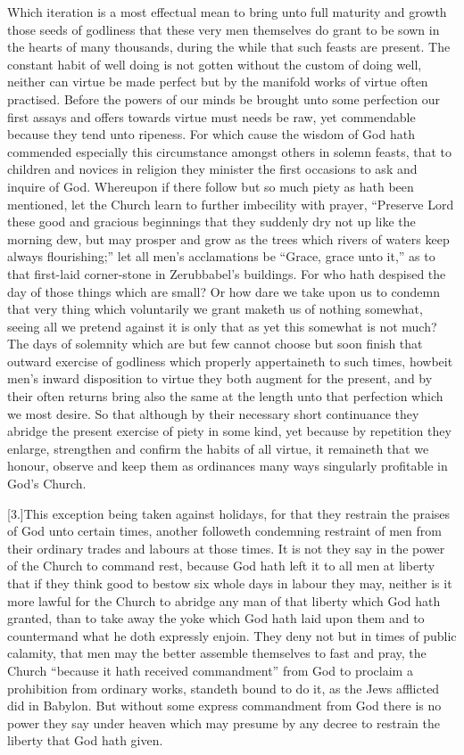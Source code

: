Which iteration is a most effectual mean to bring unto full maturity and growth those seeds of godliness that these very men themselves do grant to be sown in the hearts of many thousands, during the while that such feasts are present. The constant habit of well doing is not gotten without the custom of doing well, neither can virtue be made perfect but by the manifold works of virtue often practised. Before the powers of our minds be brought unto some perfection our first assays and offers towards virtue must needs be raw, yet commendable because they tend unto ripeness. For which cause the wisdom of God hath commended especially this circumstance amongst others in solemn feasts, that to children and novices in religion they minister the first  occasions to ask and inquire of God.
 Whereupon if there follow but so much piety as hath been mentioned, let the Church learn to further imbecility with prayer, “Preserve Lord these good and gracious beginnings that they suddenly dry not up like the morning dew, but may prosper and grow as the trees which rivers of waters keep always flourishing;” let all men’s acclamations be “Grace, grace unto it,” as to that first-laid corner-stone in Zerubbabel’s buildings. For who hath despised the day of those things which are small? Or how dare we take upon us to condemn that very thing which voluntarily we grant maketh us of nothing somewhat, seeing all we pretend against it is only that as yet this somewhat is not much? The days of solemnity which are but few cannot choose but soon finish that outward exercise of godliness which properly appertaineth to such times, howbeit men’s inward disposition to virtue they both augment for the present, and by their often returns bring also the same at the length unto that perfection which we most desire. So that although by their necessary short continuance they abridge the present exercise of piety in some kind, yet because by repetition they enlarge, strengthen and confirm the habits of all virtue, it remaineth that we honour, observe and keep them as ordinances many ways singularly profitable in God’s Church.

[3.]This exception being taken against holidays, for that they restrain the praises of God unto certain times, another followeth condemning restraint of men from their ordinary trades and labours at those times. It is not they say in the power of the Church to command rest, because God hath  left it to all men at liberty that if they think good to bestow six whole days in labour they may,
 neither is it more lawful for the Church to abridge any man of that liberty which God hath granted, than to take away the yoke which God hath laid upon them and to countermand what he doth expressly enjoin. They deny not but in times of public calamity, that men may the better assemble themselves to fast and pray, the Church “because it hath received commandment” from God to proclaim a prohibition from ordinary works, standeth bound to do it, as the Jews afflicted did in Babylon. But without some express commandment from God there is no power they say under heaven which may presume by any decree to restrain the liberty that God hath given.

